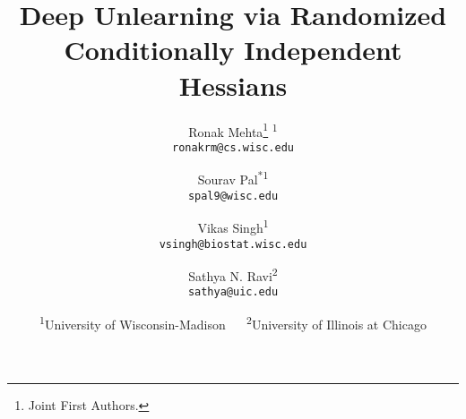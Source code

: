 \documentclass[10pt,twocolumn,letterpaper]{article}
\begin{document}
\title{Deep Unlearning via Randomized Conditionally Independent Hessians}

\author{Ronak Mehta\thanks{Joint First Authors.} \textsuperscript{\rm 1}\\
{\tt\small ronakrm@cs.wisc.edu}
\and
Sourav Pal\textsuperscript{*\rm 1}\\
{\tt\small spal9@wisc.edu}
\and
Vikas Singh\textsuperscript{\rm 1} \\
{\tt\small vsingh@biostat.wisc.edu}
\and
Sathya N. Ravi\textsuperscript{\rm 2} \\
{\tt\small sathya@uic.edu}
\and
{\textsuperscript{\rm 1}University of Wisconsin-Madison $\quad$
\textsuperscript{\rm 2}University of Illinois at Chicago}
}

\maketitle


\begin{abstract}

\end{abstract}











{\small


}

\clearpage

\end{document}
